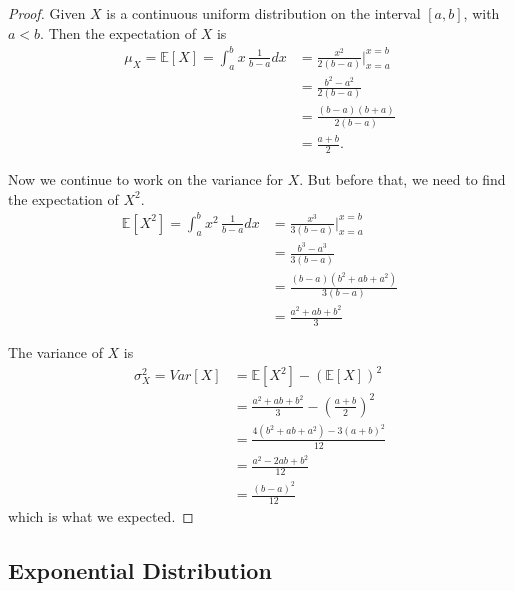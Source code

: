 \begin{proof}
    Given $X$ is a continuous uniform distribution on the interval $[a,b]$, with $a < b$. Then the 
    expectation of $X$ is 
    \begin{align*}
        \mu_X = \mathbb{E}[X] = \int_{a}^{b} x\, \frac{1}{b - a} dx
        &= \frac{x^2}{2(b - a)} \bigg \vert^{x = b}_{x = a}\\[0.5em]
        &= \frac{b^2 - a^2}{2(b-a)}\\[0.5em]
        &= \frac{(b-a)(b+a)}{2(b-a)}\\[0.5em]
        &= \frac{a+b}{2}.
    \end{align*}

    Now we continue to work on the variance for $X$. But before that, we need to find the expectation of $X^2$.
    \begin{align*}
        \mathbb{E}[X^2] = \int_{a}^{b} x^2\, \frac{1}{b - a} dx
        &= \frac{x^3}{3(b - a)} \bigg \vert^{x = b}_{x = a}\\[0.5em]
        &= \frac{b^3 - a^3}{3(b-a)} \\[0.5em]
        &= \frac{(b-a)(b^2 + ab + a^2)}{3(b-a)}\\[0.5em]
        &= \frac{a^2 + ab + b^2}{3}
    \end{align*}

    The variance of $X$ is 
    \begin{align*}
        \sigma^2_X = Var[X] &= \mathbb{E}[X^2] - (\mathbb{E}[X])^2\\[0.5em]
        &= \frac{a^2 + ab + b^2}{3} - \left( \frac{a+b}{2} \right)^2\\[0.5em]
        &= \frac{4(b^2 + ab + a^2) - 3(a+b)^2}{12}\\[0.5em]
        &= \frac{a^2 - 2ab + b^2}{12}\\[0.5em]
        &= \frac{(b-a)^2}{12}
    \end{align*}
    which is what we expected.
\end{proof}

\subsection{Exponential Distribution}

